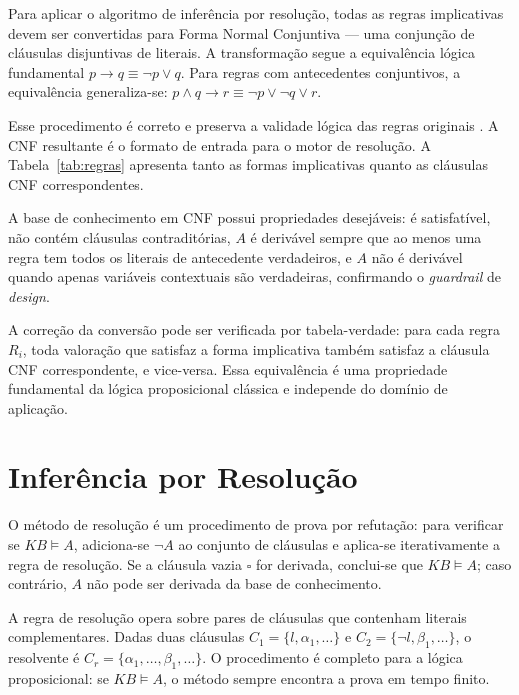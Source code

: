 \documentclass[
    12pt,
    openright,
    oneside,
    a4paper,
    english,
    brazil
]{abntex2}
\begin{document}
Para aplicar o algoritmo de inferência por resolução, todas as regras implicativas devem ser convertidas para Forma Normal Conjuntiva --- uma conjunção de cláusulas disjuntivas de literais. A transformação segue a equivalência lógica fundamental $p \rightarrow q \equiv \neg p \lor q$. Para regras com antecedentes conjuntivos, a equivalência generaliza-se: $p \land q \rightarrow r \equiv \neg p \lor \neg q \lor r$.

Esse procedimento é correto e preserva a validade lógica das regras originais \cite{russell_norvig_2022}. A CNF resultante é o formato de entrada para o motor de resolução. A Tabela~\ref{tab:regras} apresenta tanto as formas implicativas quanto as cláusulas CNF correspondentes.

A base de conhecimento em CNF possui propriedades desejáveis: é satisfatível, não contém cláusulas contraditórias, $A$ é derivável sempre que ao menos uma regra tem todos os literais de antecedente verdadeiros, e $A$ não é derivável quando apenas variáveis contextuais são verdadeiras, confirmando o \textit{guardrail} de \textit{design}.

A correção da conversão pode ser verificada por tabela-verdade: para cada regra $R_i$, toda valoração que satisfaz a forma implicativa também satisfaz a cláusula CNF correspondente, e vice-versa. Essa equivalência é uma propriedade fundamental da lógica proposicional clássica e independe do domínio de aplicação.

\chapter{Inferência por Resolução}

O método de resolução é um procedimento de prova por refutação: para verificar se $KB \models A$, adiciona-se $\neg A$ ao conjunto de cláusulas e aplica-se iterativamente a regra de resolução. Se a cláusula vazia $\square$ for derivada, conclui-se que $KB \models A$; caso contrário, $A$ não pode ser derivada da base de conhecimento.

A regra de resolução opera sobre pares de cláusulas que contenham literais complementares. Dadas duas cláusulas $C_1 = \{l, \alpha_1, \ldots\}$ e $C_2 = \{\neg l, \beta_1, \ldots\}$, o resolvente é $C_r = \{\alpha_1, \ldots, \beta_1, \ldots\}$. O procedimento é completo para a lógica proposicional: se $KB \models A$, o método sempre encontra a prova em tempo finito.
\end{document}
